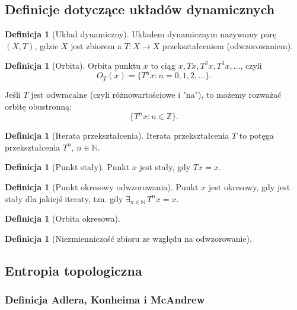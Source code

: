 \documentclass[licencjacka]{pwr_wmat_praca_dyplomowa}
\theoremstyle{plain}
\numberwithin{theorem}{chapter}
\theoremstyle{definition}
\numberwithin{theorem}{chapter}
\newtheorem{definition}[theorem]{Definicja}
\begin{document}
\subsection{Definicje dotyczące układów dynamicznych}

\begin{definition}[Układ dynamiczny]
Układem dynamicznym nazywamy parę $(X, T)$, gdzie $X$ jest zbiorem a $T:X \rightarrow X$ przekształceniem (odwzorowaniem).
\end{definition}

\begin{definition}[Orbita]
Orbita punktu $x$ to ciąg $x, Tx, T^2x, T^3x,\ldots$, czyli 
$$O_T(x) = \{T^nx: n=0,1,2,\ldots\}.$$

Jeśli $T$ jest odwracalne (czyli różnowartościowe i "na"), to możemy rozważać orbitę obustronną:
$$\{T^nx: n \in \mathbb{Z}\}.$$
\end{definition}

\begin{definition}[Iterata przekształcenia]
Iterata przekształcenia $T$ to potęga przekształcenia $T^n$, $n \in \mathbb{N}$.
\end{definition}

\begin{definition}[Punkt stały]
Punkt $x$ jest stały, gdy $Tx = x$.
\end{definition}

\begin{definition}[Punkt okresowy odwzorowania]
Punkt $x$ jest okresowy, gdy jest stały dla jakiejś iteraty, tzn. gdy $\exists_{n \in \mathbb{N}} \, T^nx = x$.
\end{definition}


\begin{definition}[Orbita okresowa]
\end{definition}

\begin{definition}[Niezmienniczość zbioru ze względu na odwzorowanie]
\end{definition}



\subsection{Entropia topologiczna}

\subsubsection{Definicja Adlera, Konheima i McAndrew}
\end{document}
